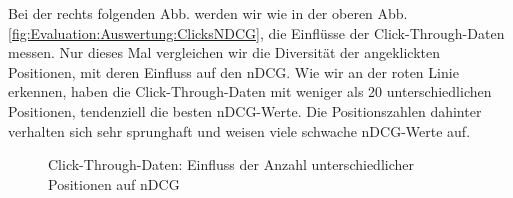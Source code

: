 \begin{minipage}{0.40\linewidth}
Bei der rechts folgenden Abb. werden wir wie in der oberen Abb. \ref{fig:Evaluation:Auswertung:ClicksNDCG}, die Einflüsse der Click-Through-Daten messen. Nur dieses Mal vergleichen wir die Diversität der angeklickten Positionen, mit deren Einfluss auf den nDCG. Wie wir an der roten Linie erkennen, haben die Click-Through-Daten mit weniger als 20 unterschiedlichen Positionen, tendenziell die besten nDCG-Werte. Die Positionszahlen dahinter verhalten sich sehr sprunghaft und weisen viele schwache nDCG-Werte auf.
\end{minipage}
\hfill
\begin{minipage}{0.55\linewidth}
\begin{figure}[H]
\centering 
\vspace{-1em}
\caption[Click-Through-Daten: Einfluss der Anzahl unterschiedlicher Positionen auf nDCG]{Click-Through-Daten: Einfluss der Anzahl unterschiedlicher Positionen auf nDCG}
\label{fig:Evaluation:Auswertung:RanksNDCG}

\footnotesize
{}\ranks
\pgfsetplotmarksize{.5pt}
  

\vspace{-2em}
\end{figure}
\end{minipage}
